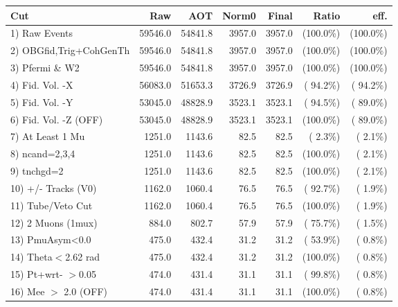  \begin{table}[h!]\centering
 \begin{tabular}{||l||r|r|r|r|r|r||}
 \hline
 \hline
 Cut & Raw & AOT & Norm0 & Final & Ratio & eff.       \\
 \hline
  1) Raw Events           &      59546.0 &      54841.8 &       3957.0 &       3957.0 & (100.0\%) & (100.0\%) \\
  2) OBGfid,Trig+CohGenTh &      59546.0 &      54841.8 &       3957.0 &       3957.0 & (100.0\%) & (100.0\%) \\
  3) Pfermi \& W2         &      59546.0 &      54841.8 &       3957.0 &       3957.0 & (100.0\%) & (100.0\%) \\
  4) Fid. Vol. -X         &      56083.0 &      51653.3 &       3726.9 &       3726.9 & ( 94.2\%) & ( 94.2\%) \\
  5) Fid. Vol. -Y         &      53045.0 &      48828.9 &       3523.1 &       3523.1 & ( 94.5\%) & ( 89.0\%) \\
  6) Fid. Vol. -Z (OFF)   &      53045.0 &      48828.9 &       3523.1 &       3523.1 & (100.0\%) & ( 89.0\%) \\
  7) At Least 1 Mu        &       1251.0 &       1143.6 &         82.5 &         82.5 & (  2.3\%) & (  2.1\%) \\
  8) ncand=2,3,4          &       1251.0 &       1143.6 &         82.5 &         82.5 & (100.0\%) & (  2.1\%) \\
  9) tnchgd=2             &       1251.0 &       1143.6 &         82.5 &         82.5 & (100.0\%) & (  2.1\%) \\
 10) +/- Tracks (V0)      &       1162.0 &       1060.4 &         76.5 &         76.5 & ( 92.7\%) & (  1.9\%) \\
 11) Tube/Veto Cut        &       1162.0 &       1060.4 &         76.5 &         76.5 & (100.0\%) & (  1.9\%) \\
 12) 2 Muons (1mux)       &        884.0 &        802.7 &         57.9 &         57.9 & ( 75.7\%) & (  1.5\%) \\
 13) PmuAsym<0.0          &        475.0 &        432.4 &         31.2 &         31.2 & ( 53.9\%) & (  0.8\%) \\
 14) Theta$<$2.62 rad     &        475.0 &        432.4 &         31.2 &         31.2 & (100.0\%) & (  0.8\%) \\
 15) Pt+wrt- $>$0.05      &        474.0 &        431.4 &         31.1 &         31.1 & ( 99.8\%) & (  0.8\%) \\
 16) Mee $>$ 2.0  (OFF)   &        474.0 &        431.4 &         31.1 &         31.1 & (100.0\%) & (  0.8\%) \\

\end{tabular}
\end{table}
